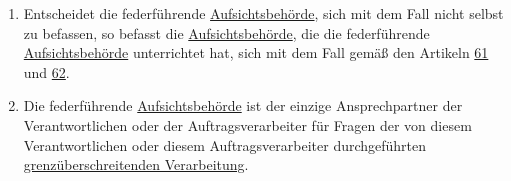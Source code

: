 \begin{enumerate}
  \item Entscheidet die federführende \hyperref[itm:04-21]{Aufsichtsbehörde}, sich mit dem Fall nicht selbst zu befassen, so befasst die
   \hyperref[itm:04-21]{Aufsichtsbehörde}, die die federführende \hyperref[itm:04-21]{Aufsichtsbehörde} unterrichtet hat, sich mit dem Fall gemäß den Artikeln
   \hyperref[ch:61]{61} und \hyperref[ch:62]{62}.
  \label{itm:56-5}

  \item Die federführende \hyperref[itm:04-21]{Aufsichtsbehörde} ist der einzige Ansprechpartner der Verantwortlichen oder der
   Auftragsverarbeiter für Fragen der von diesem Verantwortlichen oder diesem Auftragsverarbeiter durchgeführten
   \hyperref[itm:04-23]{grenzüberschreitenden Verarbeitung}.
  \label{itm:56-6}

\end{enumerate}


